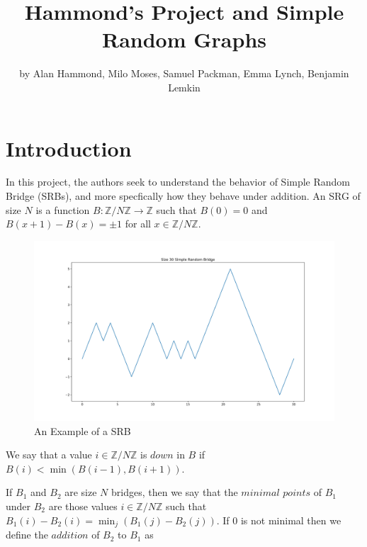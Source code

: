 \documentclass{article}
\title{Hammond's Project and Simple Random Graphs}
\author{by Alan Hammond, Milo Moses, Samuel Packman, Emma Lynch, Benjamin Lemkin}
\theoremstyle{definition}
\begin{document}
\maketitle

\newcommand{\lcm}{\mathrm{lcm}}


\tableofcontents
\newcommand{\R}{\mathbb{R}}
\newcommand{\Z}{\mathbb{Z}}
\newcommand{\N}{\mathbb{N}}
\newcommand{\C}{\mathbb{C}}
\newcommand{\class}{\mathcal{C}}
\newcommand{\E}{\mathbb{E}_{B}}
\newcommand{\Esup}{\mathbb{E}^{\mathrm{sup}}_{n\in\mathbb{N}}}
\newcommand{\rad}{\mathrm{rad}}


\section{Introduction}

In this project, the authors seek to understand the behavior of Simple Random Bridge (SRBs), and more specfically how they behave under addition. An SRG of size $N$ is a function $B:\Z/N\Z\to\Z$ such that $B(0)=0$ and $B(x+1)-B(x)=\pm 1$ for all $x\in \Z/N\Z$.

\begin{figure}[h]
\caption{An Example of a SRB}
\centering
\includegraphics[width=\textwidth]{Figure_1}
\end{figure}

We say that a value $i\in \Z/N\Z$ is $\mathit{down}$ in $B$ if $B(i)<\min(B(i-1),B(i+1))$.

If $B_1$ and $B_2$ are size $N$ bridges, then we say that the $\mathit{minimal \,\,points}$ of $B_1$ under $B_2$ are those values $i\in \Z/N\Z$ such that $B_1(i)-B_2(i)=\min_{j}\left(B_1(j)-B_2(j)\right)$. If $0$ is not minimal then we define the $\mathit{addition}$ of $B_2$ to $B_1$ as
\end{document}
